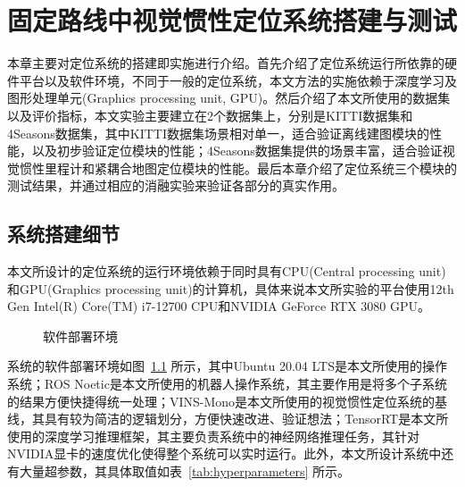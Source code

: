 




\chapter{固定路线中视觉惯性定位系统搭建与测试}

本章主要对定位系统的搭建即实施进行介绍。首先介绍了定位系统运行所依靠的硬件平台以及软件环境，不同于一般的定位系统，本文方法的实施依赖于深度学习及图形处理单元(Graphics processing unit, GPU)。然后介绍了本文所使用的数据集以及评价指标，本文实验主要建立在2个数据集上，分别是KITTI数据集和4Seasons数据集，其中KITTI数据集场景相对单一，适合验证离线建图模块的性能，以及初步验证定位模块的性能；4Seasons数据集提供的场景丰富，适合验证视觉惯性里程计和紧耦合地图定位模块的性能。最后本章介绍了定位系统三个模块的测试结果，并通过相应的消融实验来验证各部分的真实作用。

\section{系统搭建细节}

本文所设计的定位系统的运行环境依赖于同时具有CPU(Central processing unit)和GPU(Graphics processing unit)的计算机，具体来说本文所实验的平台使用12th Gen Intel(R) Core(TM) i7-12700 CPU和NVIDIA GeForce RTX 3080 GPU。

\begin{figure}
  \centering
  \caption{软件部署环境}
  \label{fig:software}
\end{figure}

系统的软件部署环境如图~\ref{fig:software} 所示，其中Ubuntu 20.04 LTS是本文所使用的操作系统；ROS Noetic是本文所使用的机器人操作系统，其主要作用是将多个子系统的结果方便快捷得统一处理；VINS-Mono是本文所使用的视觉惯性定位系统的基线，其具有较为简洁的逻辑划分，方便快速改进、验证想法；TensorRT是本文所使用的深度学习推理框架，其主要负责系统中的神经网络推理任务，其针对NVIDIA显卡的速度优化使得整个系统可以实时运行。此外，本文所设计系统中还有大量超参数，其具体取值如表~\ref{tab:hyperparameters} 所示。

